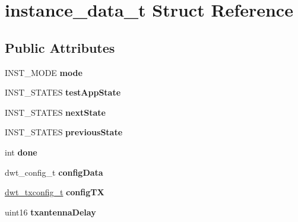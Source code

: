 \hypertarget{structinstance__data__t}{\section{instance\-\_\-data\-\_\-t Struct Reference}
\label{structinstance__data__t}
}
\subsection*{Public Attributes}
\begin{DoxyCompactItemize}
\item 
\hypertarget{structinstance__data__t_ac597dac5bd2f43dbd80ccca9617ea952}{I\-N\-S\-T\-\_\-\-M\-O\-D\-E {\bfseries mode}}\label{structinstance__data__t_ac597dac5bd2f43dbd80ccca9617ea952}

\item 
\hypertarget{structinstance__data__t_a3cc58a0df644a08ac82a44791d2d7c2c}{I\-N\-S\-T\-\_\-\-S\-T\-A\-T\-E\-S {\bfseries test\-App\-State}}\label{structinstance__data__t_a3cc58a0df644a08ac82a44791d2d7c2c}

\item 
\hypertarget{structinstance__data__t_a4fc212972b985fd181d8b1d1c2d35623}{I\-N\-S\-T\-\_\-\-S\-T\-A\-T\-E\-S {\bfseries next\-State}}\label{structinstance__data__t_a4fc212972b985fd181d8b1d1c2d35623}

\item 
\hypertarget{structinstance__data__t_a3656df7739d16ab0be2aa482a1732238}{I\-N\-S\-T\-\_\-\-S\-T\-A\-T\-E\-S {\bfseries previous\-State}}\label{structinstance__data__t_a3656df7739d16ab0be2aa482a1732238}

\item 
\hypertarget{structinstance__data__t_a78026be564cb2db772057bfd6d181209}{int {\bfseries done}}\label{structinstance__data__t_a78026be564cb2db772057bfd6d181209}

\item 
\hypertarget{structinstance__data__t_a0d78cd4b9ca1dfa4f1e9973036146345}{dwt\-\_\-config\-\_\-t {\bfseries config\-Data}}\label{structinstance__data__t_a0d78cd4b9ca1dfa4f1e9973036146345}

\item 
\hypertarget{structinstance__data__t_a57b4c20f11d4064d04eb30d1e776f420}{\hyperlink{structdwt__txconfig__t}{dwt\-\_\-txconfig\-\_\-t} {\bfseries config\-T\-X}}\label{structinstance__data__t_a57b4c20f11d4064d04eb30d1e776f420}

\item 
\hypertarget{structinstance__data__t_a65fae89e4b68c02093f5d7124154ae28}{uint16 {\bfseries txantenna\-Delay}}\label{structinstance__data__t_a65fae89e4b68c02093f5d7124154ae28}


\end{DoxyCompactItemize}
